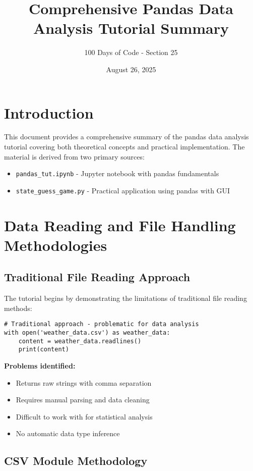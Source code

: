 \documentclass[12pt]{article}
\title{\textbf{Comprehensive Pandas Data Analysis Tutorial Summary}}
\author{100 Days of Code - Section 25}
\date{August 26, 2025}
\begin{document}
\maketitle

\tableofcontents
\newpage

\section{Introduction}

This document provides a comprehensive summary of the pandas data analysis tutorial covering both theoretical concepts and practical implementation. The material is derived from two primary sources:
\begin{itemize}
    \item \texttt{pandas\_tut.ipynb} - Jupyter notebook with pandas fundamentals
    \item \texttt{state\_guess\_game.py} - Practical application using pandas with GUI
\end{itemize}

\section{Data Reading and File Handling Methodologies}

\subsection{Traditional File Reading Approach}

The tutorial begins by demonstrating the limitations of traditional file reading methods:

\begin{lstlisting}
# Traditional approach - problematic for data analysis
with open('weather_data.csv') as weather_data:
    content = weather_data.readlines()
    print(content)
\end{lstlisting}

\textbf{Problems identified:}
\begin{itemize}
    \item Returns raw strings with comma separation
    \item Requires manual parsing and data cleaning
    \item Difficult to work with for statistical analysis
    \item No automatic data type inference
\end{itemize}

\subsection{CSV Module Methodology}
\end{document}
